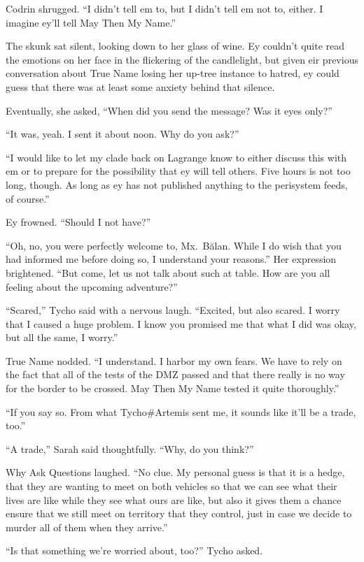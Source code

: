 Codrin shrugged. ``I didn't tell em to, but I didn't tell em not to, either. I imagine ey'll tell May Then My Name.''

The skunk sat silent, looking down to her glass of wine. Ey couldn't quite read the emotions on her face in the flickering of the candlelight, but given eir previous conversation about True Name losing her up-tree instance to hatred, ey could guess that there was at least some anxiety behind that silence.

Eventually, she asked, ``When did you send the message? Was it eyes only?''

``It was, yeah. I sent it about noon. Why do you ask?''

``I would like to let my clade back on Lagrange know to either discuss this with em or to prepare for the possibility that ey will tell others. Five hours is not too long, though. As long as ey has not published anything to the perisystem feeds, of course.''

Ey frowned. ``Should I not have?''

``Oh, no, you were perfectly welcome to, Mx.~Bălan. While I do wish that you had informed me before doing so, I understand your reasons.'' Her expression brightened. ``But come, let us not talk about such at table. How are you all feeling about the upcoming adventure?''

``Scared,'' Tycho said with a nervous laugh. ``Excited, but also scared. I worry that I caused a huge problem. I know you promised me that what I did was okay, but all the same, I worry.''

True Name nodded. ``I understand. I harbor my own fears. We have to rely on the fact that all of the tests of the DMZ passed and that there really is no way for the border to be crossed. May Then My Name tested it quite thoroughly.''

``If you say so. From what Tycho\#Artemis sent me, it sounds like it'll be a trade, too.''

``A trade,'' Sarah said thoughtfully. ``Why, do you think?''

Why Ask Questions laughed. ``No clue. My personal guess is that it is a hedge, that they are wanting to meet on both vehicles so that we can see what their lives are like while they see what ours are like, but also it gives them a chance ensure that we still meet on territory that they control, just in case we decide to murder all of them when they arrive.''

``Is that something we're worried about, too?'' Tycho asked.

